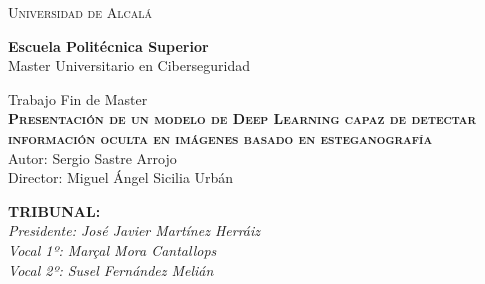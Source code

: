 
\begin{center}
\LARGE \textsc{Universidad de Alcalá}\\
\vspace{0.5cm}

\textbf{Escuela Politécnica Superior}\\

Master Universitario en Ciberseguridad
\end{center}

\vspace{0.5cm}

\begin{center}
\end{center}


\begin{center}
\vspace{1cm}

\LARGE Trabajo Fin de Master\\
\textbf{\Huge \textsc{{Presentación de un modelo de Deep Learning capaz de detectar información oculta en imágenes basado en esteganografía}}}\\
\vspace{0.5cm}
\large Autor: Sergio Sastre Arrojo\\
Director: Miguel Ángel Sicilia Urbán\\
\vspace{0.5cm}
\end{center}

\begin{flushleft}
\textbf{TRIBUNAL:}\\
\vspace{1.5cm}
\textit{Presidente: José Javier Martínez Herráiz}\\
\vspace{1.5cm}
\textit{Vocal 1º: Marçal Mora Cantallops}\\
\vspace{1.5cm}
\textit{Vocal 2º: Susel Fernández Melián}\\
\vspace{1.5cm}
\end{flushleft}

\newpage
\thispagestyle{empty}
\hspace*{0.5cm}
\newpage
